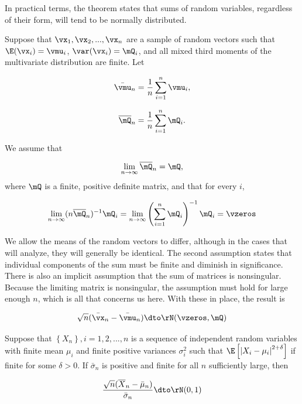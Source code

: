 In practical terms, the theorem states that sums of random variables, regardless of their form, will tend to be normally distributed. 


\begin{theorem}\label{theorem:LF_CLT_M}
Suppose that $\vx_1, \vx_2,...,\vx_n$ are a sample of random vectors such that $\E(\vx_i) = \vmu_i$, $\var(\vx_i) = \mQ_i$, and all mixed third moments of the multivariate distribution are finite. Let

\begin{equation*}
  \bar{\vmu}_n = \frac{1}{n}\sum_{i = 1}^n\vmu_i,
\end{equation*}

\begin{equation*}
  \overline{\mQ}_n = \frac{1}{n}\sum_{i = 1}^n\mQ_i.
\end{equation*}

We assume that

\begin{equation*}
  \lim_{n \to \infty}\overline{\mQ}_n  = \mQ,
\end{equation*}
%
where $\mQ$ is a finite, positive definite matrix, and that for every $i$,

\begin{equation*}
  \lim_{n \to \infty}(n\overline{\mQ}_n)^{-1}\mQ_i = \lim_{n \to \infty}\left(\sum_{i = 1}^n \mQ_i\right)^{-1} \mQ_i = \vzeros
\end{equation*}

We allow the means of the random vectors to differ, although in the cases that will analyze, they will generally be identical. The second assumption states that individual components of the sum must be finite and diminish in significance. There is also an implicit assumption that the sum of matrices is nonsingular. Because the limiting matrix is nonsingular, the assumption must hold for large enough $n$, which is all that concerns us here. With these in place, the result is

\begin{equation*}
  \sqrt{n}(\bar{\vx}_n - \bar{\vmu}_n)\dto \rN(\vzeros, \mQ)
\end{equation*}
\end{theorem}

\begin{theorem}
Suppose that $\left\lbrace X_n\right\rbrace, i = 1, 2,...,n$ is a sequence of independent random variables with finite mean $\mu_i$ and finite positive variances $\sigma^2_i$ such that $\E\left[\left|X_i - \mu_i\right|^{2 + \delta}\right]$ if finite for some $\delta > 0$. If $\bar{\sigma}_n$ is positive and finite for all $n$ sufficiently large, then

\begin{equation*}
  \frac{\sqrt{n}(\overline{X}_n - \bar{\mu}_n)}{\bar{\sigma}_n}\dto\rN(0, 1)
\end{equation*}
\end{theorem}

